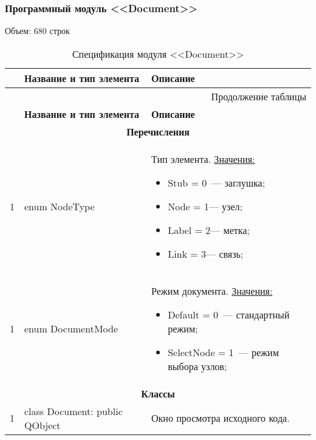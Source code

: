 \subsubsection*{Программный модуль <<Document>>}
Объем: 680 строк

\small
\singlespacing
\begin{longtable}[h]{|p{}|p{}|p{}|}
  \caption{Спецификация модуля <<Document>>}
	\\ \hline
	  \textbf{\No}                  &
	  \textbf{Название и тип элемента}  &
	  \textbf{Описание}
	\\ \hline
  \endfirsthead

  \multicolumn{3}{r}{Продолжение таблицы \thetable{}}
  \\ \hline
	  \textbf{\No}                  &
	  \textbf{Название и тип элемента}  &
	  \textbf{Описание}
	\\ \hline
  \endhead

  \multicolumn{3}{|c|}{\textbf{Перечисления}} \\
  \hline
  1 & enum NodeType &
    Тип элемента.\newline
    \uline{Значения:}
    \begin{itemize}[nolistsep,label=,leftmargin=0cm]
      \item Stub = 0~--- заглушка;
      \item Node = 1--- узел;
      \item Label = 2--- метка;
      \item Link  = 3--- связь;
    \end{itemize} \\ \hline
  1 & enum DocumentMode &
    Режим документа.\newline
    \uline{Значения:}
    \begin{itemize}[nolistsep,label=,leftmargin=0cm]
      \item Default = 0~--- стандартный режим;
      \item SelectNode = 1~--- режим выбора узлов;
    \end{itemize} \\ \hline

  \multicolumn{3}{|c|}{\textbf{Классы}} \\
  \hline
  1 & class Document: public QObject & Окно просмотра исходного кода. \\ \hline
\end{longtable}
\normalsize
\onehalfspacing



